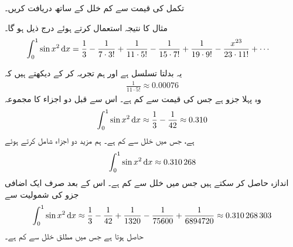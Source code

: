 تکمل  کی قیمت  سے کم خلل کے ساتھ دریافت کریں۔

 مثال   کا نتیجہ استعمال کرتے ہوئے درج ذیل ہو گا۔
\begin{align*}
\int_0^1 \sin x^2\dif x&=\frac{1}{3}-\frac{1}{7\cdot 3!}+\frac{1}{11\cdot 5!}-\frac{1}{15\cdot 7!}+\frac{1}{19\cdot 9!}-\frac{x^{23}}{23\cdot 11!}+\cdots
\end{align*}

یہ بدلتا تسلسل ہے اور ہم تجربہ کر کے   دیکھتے ہیں کہ
  \begin{align*}
\frac{1}{11\cdot5!}\approx \num{0.00076}
\end{align*}
وہ پہلا جزو ہے جس کی قیمت  سے کم ہے۔ اس سے قبل دو اجزاء کا مجموعہ
\begin{align*}
\int_0^1\sin x^2\dif x\approx \frac{1}{3}-\frac{1}{42}\approx 0.310
\end{align*}
ہے، جس میں خلل  سے کم ہے۔ ہم مزید دو اجزاء شامل کرتے ہوئے
\begin{align*}
\int_0^1\sin x^2\dif x\approx \num{0.310268}
\end{align*}
اندازہ حاصل کر سکتے ہیں جس میں خلل     سے کم ہے۔ اس کے بعد صرف ایک اضافی جزو کی شمولیت سے
\begin{align*}
\int_0^1\sin x^2\dif x\approx \frac{1}{3}-\frac{1}{42}+\frac{1}{1320}-\frac{1}{75600}+\frac{1}{6894720}\approx \num{0.310268303}
\end{align*}
حاصل ہوتا ہے جس میں  مطلق خلل  سے کم ہے۔ 

